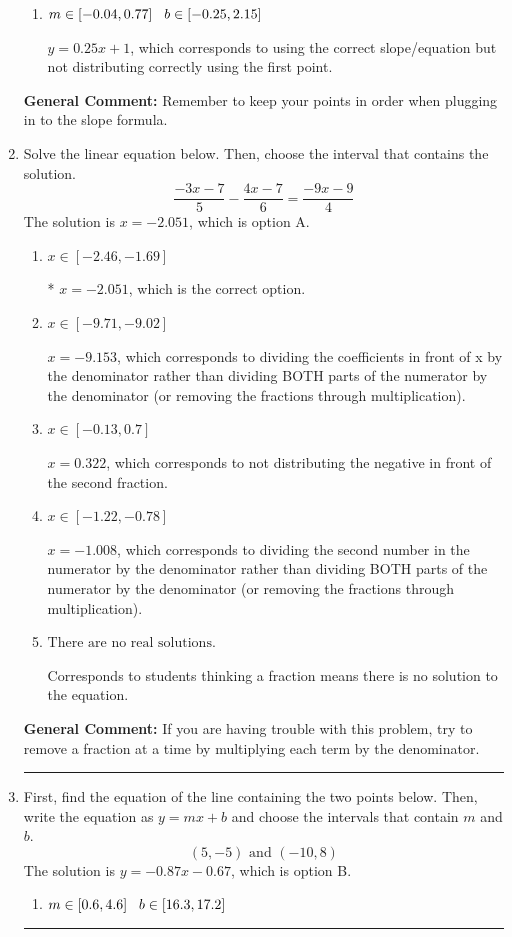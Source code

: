 \documentclass{extbook}[14pt]
\newcommand{\litem}[1]{\item #1

\rule{\textwidth}{0.4pt}}
\begin{document}
\begin{enumerate}
{\begin{enumerate}[label=\Alph*.]
 $y = -0.25x + 7.5$, which corresponds to using the negative slope and the correct equation.
\item \( m \in [-0.04, 0.77] \hspace*{3mm} b \in [-0.25, 2.15] \)

 $y = 0.25x + 1$, which corresponds to using the correct slope/equation but not distributing correctly using the first point.
\end{enumerate}

\textbf{General Comment:} Remember to keep your points in order when plugging in to the slope formula.
}
\litem{
Solve the linear equation below. Then, choose the interval that contains the solution.
\[ \frac{-3x -7}{5} - \frac{4x -7}{6} = \frac{-9x -9}{4} \]The solution is \( x = -2.051 \), which is option A.\begin{enumerate}[label=\Alph*.]
\item \( x \in [-2.46, -1.69] \)

* $x = -2.051$, which is the correct option.
\item \( x \in [-9.71, -9.02] \)

 $x = -9.153$, which corresponds to dividing the coefficients in front of x by the denominator rather than dividing BOTH parts of the numerator by the denominator (or removing the fractions through multiplication).
\item \( x \in [-0.13, 0.7] \)

 $x = 0.322$, which corresponds to not distributing the negative in front of the second fraction.
\item \( x \in [-1.22, -0.78] \)

 $x = -1.008$, which corresponds to dividing the second number in the numerator by the denominator rather than dividing BOTH parts of the numerator by the denominator (or removing the fractions through multiplication).
\item \( \text{There are no real solutions.} \)

Corresponds to students thinking a fraction means there is no solution to the equation.
\end{enumerate}

\textbf{General Comment:} If you are having trouble with this problem, try to remove a fraction at a time by multiplying each term by the denominator.
}
\litem{
First, find the equation of the line containing the two points below. Then, write the equation as $ y=mx+b $ and choose the intervals that contain $m$ and $b$.
\[ (5, -5) \text{ and } (-10, 8) \]The solution is \( y = -0.87x -0.67 \), which is option B.\begin{enumerate}[label=\Alph*.]
\item \( m \in [0.6, 4.6] \hspace*{3mm} b \in [16.3, 17.2] \)


\end{enumerate}}
\end{enumerate}
\end{document}
